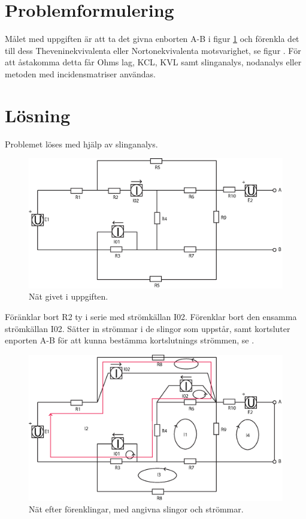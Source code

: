 \documentclass[a4paper,12pt]{article}
\begin{document}
\maketitle
\thispagestyle{empty}
\newpage

\section*{Problemformulering}
Målet med uppgiften är att ta det givna enborten A-B i figur \ref{fig:original} och förenkla det till dess Theveninekvivalenta eller Nortonekvivalenta motsvarighet, se figur \fig{}. För att åstakomma detta får Ohms lag, KCL, KVL samt slinganalys, nodanalys eller metoden med incidensmatriser användas.

\section*{Lösning}
Problemet löses med hjälp av slinganalys.

\begin{figure}[h]
\centering
\includegraphics[width=1\textwidth]{bilder/originalnat.eps}
\caption{Nät givet i uppgiften.}
\label{fig:original}
\end{figure}

Föränklar bort R2 ty i serie med strömkällan I02. Förenklar bort den ensamma strömkällan I02. Sätter in strömmar i de slingor som uppstår, samt kortsluter enporten A-B för att kunna bestämma kortslutnings strömmen, se .

\begin{figure}[h]
\centering
\includegraphics[width=1\textwidth]{bilder/modnat.eps}
\caption{Nät efter förenklingar, med angivna slingor och strömmar.}
\label{fig:modnat}
\end{figure}
\end{document}
